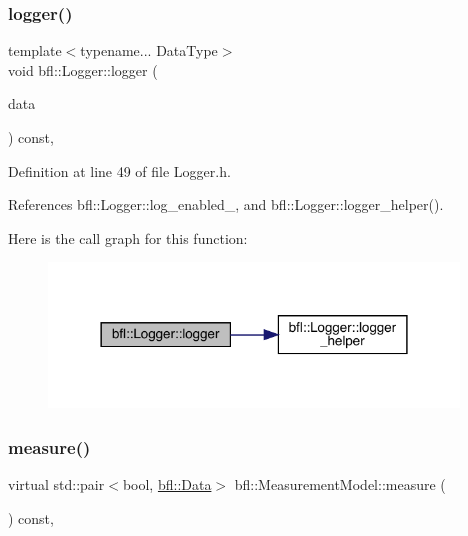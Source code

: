 \subsubsection{\texorpdfstring{logger()}{logger()}\hspace{0.1cm}{\footnotesize\ttfamily [4/4]}}
{\footnotesize\ttfamily template$<$typename... Data\+Type$>$ \\
void bfl\+::\+Logger\+::logger (\begin{DoxyParamCaption}\item[{Data\+Type...}]{data }\end{DoxyParamCaption}) const\hspace{0.3cm}{\ttfamily [inline]}, {\ttfamily [inherited]}}



Definition at line 49 of file Logger.\+h.



References bfl\+::\+Logger\+::log\+\_\+enabled\+\_\+, and bfl\+::\+Logger\+::logger\+\_\+helper().

Here is the call graph for this function\+:
\nopagebreak
\begin{figure}[H]
\begin{center}
\leavevmode
\includegraphics[width=309pt]{classbfl_1_1Logger_a0f0cf7ce956546d94dfb1feb7cebf171_cgraph}
\end{center}
\end{figure}
\mbox{\label{classbfl_1_1MeasurementModel_ad372b720cef4e6bc0ac2489f4098bfc9}} 
\subsubsection{\texorpdfstring{measure()}{measure()}}
{\footnotesize\ttfamily virtual std\+::pair$<$bool, \mbox{\hyperlink{namespacebfl_af6b103c6821db1b54452f776fdd9dd02}{bfl\+::\+Data}}$>$ bfl\+::\+Measurement\+Model\+::measure (\begin{DoxyParamCaption}{ }\end{DoxyParamCaption}) const\hspace{0.3cm}{\ttfamily [pure virtual]}, {\ttfamily [inherited]}}



